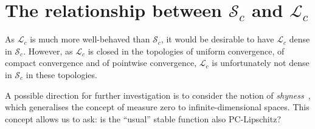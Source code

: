\section{The relationship between $\mathcal{S}_c$ and $\mathcal{L}_c$}

As $\mathcal{L}_c$ is much more well-behaved than $\mathcal{S}_c$,
it would be desirable to have $\mathcal{L}_c$ dense in $\mathcal{S}_c$.
However, as $\mathcal{L}_c$ is closed in the topologies of uniform convergence,
of compact convergence and of pointwise convergence, $\mathcal{L}_c$ is
unfortunately not dense in $\mathcal{S}_c$ in these topologies.

A possible direction for further investigation is to consider the notion of
\emph{shyness}~\cite{ott2005prevalence}, which generalises the concept of
measure zero to infinite-dimensional spaces. This concept allows us to
ask: is the ``usual'' stable function also PC-Lipschitz?

    
